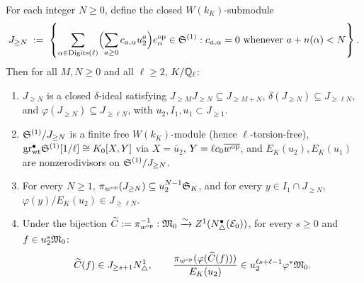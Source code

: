 \begin{lemma}\label{lem:2:weight}
\tagProved{}
For each integer $N \ge 0$, define the closed $W(k_K)$-submodule
\begin{equation}\label{eq:2:JN}
  J_{\ge N} \;:=\; \left\{ \sum_{\alpha \in \mathrm{Digits}(\ell)} \Bigl(\sum_{a \ge 0} c_{a, \alpha} u_2^a\Bigr) e_\alpha^{\mathrm{op}} \in \mathfrak{S}^{(1)} : c_{a, \alpha} = 0 \text{ whenever } a + n(\alpha) < N \right\}.
\end{equation}
Then for all $M, N \ge 0$ and all $\ell \ge 2$, $K/\mathbb{Q}_\ell$:
\begin{enumerate}[label=\textup{(\roman*)}]
\item $J_{\ge N}$ is a closed $\delta$-ideal satisfying $J_{\ge M} J_{\ge N} \subseteq J_{\ge M+N}$, $\delta(J_{\ge N}) \subseteq J_{\ge \ell N}$, and $\varphi(J_{\ge N}) \subseteq J_{\ge \ell N}$, with $u_2, I_1, u_1 \subset J_{\ge 1}$.
\item $\mathfrak{S}^{(1)}/J_{\ge N}$ is a finite free $W(k_K)$-module (hence $\ell$-torsion-free), $\mathrm{gr}^\bullet_{\mathrm{wt}}\mathfrak{S}^{(1)}[1/\ell] \cong K_0[X, Y]$ via $X = \bar{u}_2$, $Y = \ell c_0 \overline{w^{\mathrm{op}}}$, and $E_K(u_2), E_K(u_1)$ are nonzerodivisors on $\mathfrak{S}^{(1)}/J_{\ge N}$.
\item For every $N \ge 1$, $\pi_{w^{\mathrm{op}}}(J_{\ge N}) \subseteq u_2^{N-1}\mathfrak{S}_K$, and for every $y \in I_1 \cap J_{\ge N}$, $\varphi(y)/E_K(u_2) \in J_{\ge \ell N}$.
\item Under the bijection $\widetilde{C} := \pi_{w^{\mathrm{op}}}^{-1} : \mathfrak{M}_0 \xrightarrow{\sim} Z^1(N^\bullet_\triangle(\mathcal{E}_0))$, for every $s \ge 0$ and $f \in u_2^s \mathfrak{M}_0$:
\begin{equation}\label{eq:2:cocycle-wt}
  \widetilde{C}(f) \in J_{\ge s+1} N^1_\triangle, \qquad \frac{\pi_{w^{\mathrm{op}}}(\varphi(\widetilde{C}(f)))}{E_K(u_2)} \in u_2^{\ell s + \ell - 1} \varphi^*\mathfrak{M}_0.
\end{equation}
\end{enumerate}
\end{lemma}
